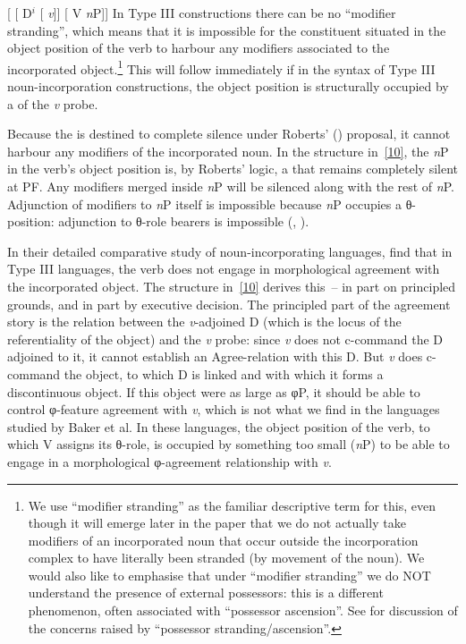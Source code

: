 \documentclass[output=paper]{langsci/langscibook}
\begin{document}
\begin{refcontext}
\ea {}[ [ D$^i$ [ \hspace{-.4em}\emph{v}\tss{\{[+V], \Acc{}, \ldots{}\}}]] [ V \emph{n}P\tss{\{[+N]\}}]] \label{10}
\z
In Type III constructions there can be no \enquote{modifier stranding}, which means
that it is impossible for the constituent situated in the object position of
the verb to harbour any modifiers associated to the incorporated
object.\footnote{We use \enquote{modifier stranding} as the familiar descriptive
    term for this, even though it will emerge later in the paper that we do not
    actually take modifiers of an incorporated noun that occur outside the
    incorporation complex to have literally been stranded (by movement of the
    noun). We would also like to emphasise that under \enquote{modifier stranding}
    we do NOT understand the presence of external possessors: this is a
different phenomenon, often associated with \enquote{possessor ascension}. See
\citet[168]{bakeretal05} for discussion of the concerns raised by \enquote{possessor
stranding/ascension}.} This will follow immediately if in the syntax of Type
III noun-incorporation constructions, the object position is structurally
occupied by a  of the \emph{v} probe.

Because the  is destined to complete silence under  Roberts'
(\citeyear{Roberts2010}) proposal, it cannot harbour any modifiers of the
incorporated noun. In the structure in~\eqref{10}, the \emph{n}P in the verb's
object position is, by Roberts' logic, a  that remains completely
silent at PF. Any modifiers merged inside \emph{n}P will be silenced along with
the rest of \emph{n}P. Adjunction of modifiers to \emph{n}P itself is
impossible because \emph{n}P occupies a θ{}-position: adjunction to
θ-role bearers is impossible (\citealt[6]{Chomsky1986},
\citealt[57]{mccloskey96}).

In their detailed comparative study of noun-incorporating languages,
\citet{bakeretal05} find that in Type III languages, the verb does not engage in
morphological agreement with the incorporated object. The structure in~\eqref{10}
derives this~-- in part on principled grounds, and in part by executive
decision. The principled part of the agreement story is the relation between
the \emph{v}-adjoined D (which is the locus of the referentiality of the
object) and the \emph{v} probe: since \emph{v} does not c-command the D
adjoined to it, it cannot establish an Agree-relation with this D. But \emph{v}
does c-command the object, to which D is linked and with which it forms a
discontinuous object. If this object were as large as φ{}P, it should be
able to control φ{}-feature agreement with \emph{v}, which is not what
we find in the languages studied by Baker et al. In these languages, the object
position of the verb, to which V assigns its θ-role, is occupied by
something too small (\emph{n}P) to be able to engage in a morphological
φ{}-agreement relationship with \emph{v}.


\end{refcontext}
\end{document}
